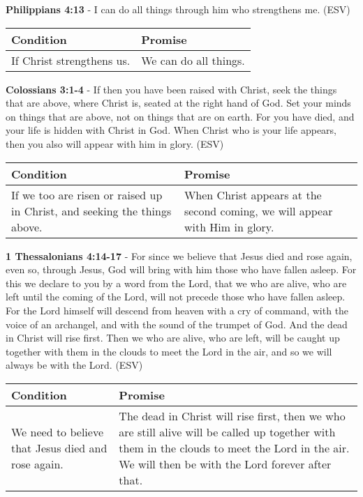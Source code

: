 \documentclass[11pt]{article}
\begin{document}
\textbf{Philippians 4:13} - I can do all things through him who strengthens me. (ESV)

\begin{center}
\begin{tabular}{ll}
Condition & Promise\\[0pt]
\hline
If Christ strengthens us. & We can do all things.\\[0pt]
\end{tabular}
\end{center}

\textbf{Colossians 3:1-4} - If then you have been raised with Christ, seek the things that are above, where Christ is, seated at the right hand of God. Set your minds on things that are above, not on things that are on earth. For you have died, and your life is hidden with Christ in God. When Christ who is your life appears, then you also will appear with him in glory. (ESV)

\begin{center}
\begin{tabular}{ll}
Condition & Promise\\[0pt]
\hline
If we too are risen or raised up in Christ, and seeking the things above. & When Christ appears at the second coming, we will appear with Him in glory.\\[0pt]
\end{tabular}
\end{center}

\textbf{1 Thessalonians 4:14-17} - For since we believe that Jesus died and rose again, even so, through Jesus, God will bring with him those who have fallen asleep. For this we declare to you by a word from the Lord, that we who are alive, who are left until the coming of the Lord, will not precede those who have fallen asleep. For the Lord himself will descend from heaven with a cry of command, with the voice of an archangel, and with the sound of the trumpet of God. And the dead in Christ will rise first. Then we who are alive, who are left, will be caught up together with them in the clouds to meet the Lord in the air, and so we will always be with the Lord. (ESV)

\begin{center}
\begin{tabular}{ll}
Condition & Promise\\[0pt]
\hline
We need to believe that Jesus died and rose again. & The dead in Christ will rise first, then we who are still alive will be called up together with them in the clouds to meet the Lord in the air. We will then be with the Lord forever after that.\\[0pt]
\end{tabular}
\end{center}
\end{document}
